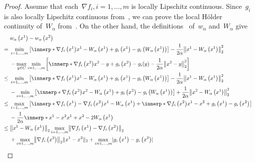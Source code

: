 \documentclass[../../main]{subfiles}
\begin{document}
\begin{proof}
              Assume that each~$\nabla f_i, i = 1, \dots, m$ is locally Lipschitz continuous.
              Since~$g_i$ is also locally Lipschitz continuous from~, we can prove the local H\"older continuity of~$W_\alpha$ from~.
              On the other hand, the definitions~ of~$w_\alpha$ and~$W_\alpha$ give
              \begin{align} 
                    &w_\alpha\left(x^1\right) - w_\alpha\left(x^2\right) \\
                  ={}& \min_{i = 1, \dots, m} \left[ \innerp*{\nabla f_i\left(x^1\right)}{x^1 - W_\alpha\left(x^1\right)} + g_i\left(x^1\right) - g_i\left(W_\alpha\left(x^1\right)\right) \right] - \frac{1}{2 \alpha} \norm*{x^1 - W_\alpha\left(x^1\right)}_2^2 \\
                     &- \max_{y \in C} \min_{i = 1, \dots, m} \left[ \innerp*{\nabla f_i\left(x^2\right)}{x^2 - y} + g_i\left(x^2\right) - g_i(y) - \frac{1}{2 \alpha} \norm*{x^2 - y}_2^2 \right] \\
                  \le{}& \min_{i = 1, \dots, m} \left[ \innerp*{\nabla f_i\left(x^1\right)}{x^1 - W_\alpha\left(x^1\right)} + g_i\left(x^1\right) - g_i\left(W_\alpha\left(x^1\right)\right) \right] - \frac{1}{2 \alpha} \norm*{x^1 - W_\alpha\left(x^1\right)}_2^2 \\
                       &- \min_{i = 1, \dots, m} \left[ \innerp*{\nabla f_i\left(x^2\right)}{x^2 - W_\alpha\left(x^1\right)} + g_i\left(x^2\right) - g_i\left(W_\alpha\left(x^1\right)\right) \right] + \frac{1}{2 \alpha} \norm*{x^2 - W_\alpha\left(x^1\right)}_2^2 \\
                  \le{}& \max_{i = 1, \dots, m} \left[ \innerp*{\nabla f_i\left(x^1\right) - \nabla f_i\left(x^2\right)}{x^1 - W_\alpha\left(x^1\right)} + \innerp*{\nabla f_i\left(x^2\right)}{x^1 - x^2} + g_i\left(x^1\right) - g_i\left(x^2\right) \right] \\
                       &- \frac{1}{2 \alpha} \innerp*{x^1 - x^2}{x^1 + x^2 - 2 W_\alpha\left(x^1\right)} \\
                  \le{}& \norm*{x^1 - W_\alpha\left(x^1\right)}_2 \max_{i = 1, \dots, m} \norm*{\nabla f_i\left(x^1\right) - \nabla f_i\left(x^2\right)}_2 \\
                       &+ \max_{i = 1, \dots, m} \norm*{\nabla f_i\left(x^2\right)}_2 \norm{x^1 - x^2}_2 + \max_{i = 1, \dots, m} \abs{g_i\left(x^1\right) - g_i\left(x^2\right)} \\

\end{align}
\end{proof}
\end{document}
